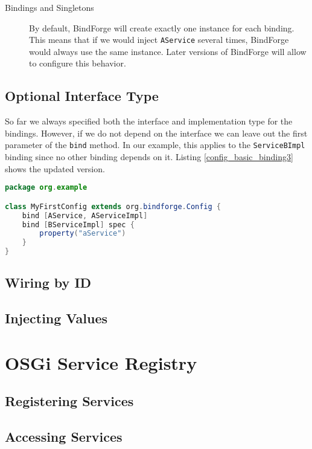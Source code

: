 \begin{description}
 \item[Bindings and Singletons] By default, BindForge will create exactly one instance for each binding. This means that if we would inject \verb!AService! several times, BindForge would always use the same instance. Later versions of BindForge will allow to configure this behavior.
\end{description}

\subsection{Optional Interface Type}

So far we always specified both the interface and implementation type for the bindings. However, if we do not depend on the interface we can leave out the first parameter of the \verb!bind! method. In our example, this applies to the \verb!ServiceBImpl! binding since no other binding depends on it. Listing \ref{config_basic_binding3} shows the updated version.

\begin{lstlisting}[caption={Simple bindings},label=config_basic_binding3,language=Java]
package org.example

class MyFirstConfig extends org.bindforge.Config {
    bind [AService, AServiceImpl]
    bind [BServiceImpl] spec {
        property("aService")
    }
}
\end{lstlisting}

\subsection{Wiring by ID}






\subsection{Injecting Values}







\section{OSGi Service Registry}

\subsection{Registering Services}

\subsection{Accessing Services}








